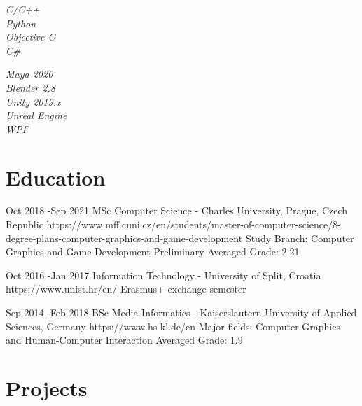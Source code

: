 \documentclass[10pt]{article} %
\begin{document}
\parbox{0.5\textwidth}{ %
	{
		\textit{C/C++}\\
		\textit{Python}\\
		\textit{Objective-C}\\
		\textit{C\#}\\
		
	}
}
\hfill %
\parbox{0.5\textwidth}{ %
	{
		\textit{Maya 2020}\\
		\textit{Blender 2.8}\\
		\textit{Unity 2019.x}\\
		\textit{Unreal Engine } \\
		\textit{WPF}
	}
}







\section{Education}

\job
{Oct 2018 -}{Sep 2021} 
{MSc Computer Science - Charles University, Prague, Czech Republic} 
{https://www.mff.cuni.cz/en/students/master-of-computer-science/8-degree-plans-computer-graphics-and-game-development}
{Study Branch: Computer Graphics and Game Development}
{Preliminary Averaged Grade: 2.21}
{}


\job
{Oct 2016 -}{Jan 2017} 
{Information Technology - University of Split, Croatia}
{https://www.unist.hr/en/}
{Erasmus+ exchange semester}
{}
{}


\job
{Sep 2014 -}{Feb 2018}
{BSc Media Informatics - Kaiserslautern University of Applied Sciences, Germany} {https://www.hs-kl.de/en}
{Major fields: Computer Graphics and Human-Computer Interaction}
{Averaged Grade: 1.9}
{}
{}


\section{Projects}
\end{document}
